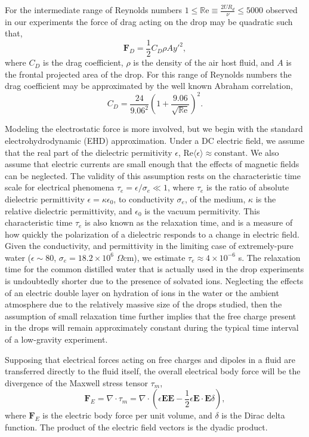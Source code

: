 \documentclass[12pt,a4paper,oneside]{book}
\begin{document}
For the intermediate range of Reynolds numbers $1 \leq \mathbb{R}\mbox{e} \equiv \frac{2UR_d}{\nu} \leq 5000 $ observed in our experiments the force of drag acting on the drop may be quadratic such that,
\begin{equation*}\label{drag_force}
\mathbf{F}_D = \frac{1}{2}C_D \rho A {y'}^2,
\end{equation*}
where $C_D$ is the drag coefficient, $\rho$ is the density of the air host fluid, and $A$ is the frontal projected area of the drop. For this range of Reynolds numbers the drag coefficient may be approximated by the well known Abraham correlation\cite{abraham_functional_1970},
\[C_D = \frac{24}{9.06^2} \left( 1 + \frac{9.06}{\sqrt{\mathbb{R}\mbox{e}}} \right)^2 .\]

Modeling the electrostatic force is more involved, but we begin with the standard electrohydrodynamic (EHD) approximation\cite{saville_electrohydrodynamics:_1997}. Under a DC electric field, we assume that the real part of the dielectric permitivity $\epsilon$, $\mbox{Re} \langle \epsilon \rangle \approx  \mbox{constant}$. We also assume that electric currents are small enough that the effects of magnetic fields can be neglected. The validity of this assumption rests on the characteristic time scale for electrical phenomena $\tau_e = \epsilon /\sigma_e \ll 1$, where $\tau_e$ is the ratio of absolute dielectric permittivity $\epsilon = \kappa \epsilon_0$, to conductivity $\sigma_e$, of the medium, $\kappa$ is the relative dielectric permittivity, and $\epsilon_0$ is the vacuum permitivity. This characteristic time $\tau_e$ is also known as the relaxation time, and is a measure of how quickly the polarization of a dielectric responds to a change in electric field. Given the conductivity, and permittivity in the limiting case of extremely-pure water ($ \epsilon \sim 80$, $\sigma_e = 18.2 \times 10^{6}$ $\Omega\mbox{cm}$)\cite{yatsuzuka_electrification_1994}, we estimate $\tau_e \approx 4 \times 10^{-6}$ s. The relaxation time for the common distilled water that is actually used in the drop experiments is undoubtedly shorter due to the presence of solvated ions. Neglecting the effects of an electric double layer on hydration of ions in the water or the ambient atmosphere due to the relatively massive size of the drops studied, then the assumption of small relaxation time further implies that the free charge present in the drops will remain approximately constant during the typical time interval of a low-gravity experiment.

Supposing that electrical forces acting on free charges and dipoles in a fluid are transferred directly to the fluid itself, the overall electrical body force will be the divergence of the Maxwell stress tensor $\tau_m $,
\[ \mathbf{F}_E = \nabla \cdot \tau_m = \nabla \cdot \left( \epsilon \mathbf{E} \mathbf{E} - \frac{1}{2} \epsilon \mathbf{E} \cdot \mathbf{E} \delta \right) ,\]
where $\mathbf{F}_E$ is the electric body force per unit volume, and $\delta$ is the Dirac delta function. The product of the electric field vectors is the dyadic product.  
\end{document}
